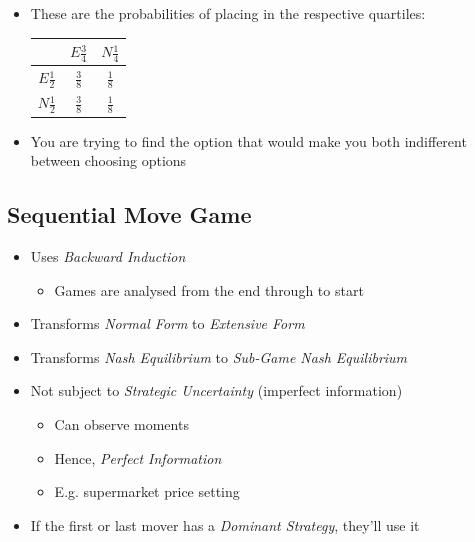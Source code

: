 \documentclass[11pt, english]{article}
\begin{document}
\begin{itemize}
\begin{itemize}
\begin{table}[h]
				\end{table}
			\item These are the probabilities of placing in the respective quartiles:
				\begin{table}[h]
					\scriptsize
                                        \renewcommand{\arraystretch}{1.25}
                                \begin{center}      
                                \begin{tabular}{|c|c|c|}
					\hline
					& $E\frac{3}{4}$ & $N\frac{1}{4}$\\
					\hline
					$E\frac{1}{2}$ & $\frac{3}{8}$ & $\frac{1}{8}$\\
					\hline
					$N\frac{1}{2}$ & $\frac{3}{8}$ & $\frac{1}{8}$\\
					\hline
				\end{tabular}
                                \end{center} 
                                \end{table}
			\item You are trying to find the option that would make you both indifferent between choosing options
		\end{itemize}
	\end{itemize}

	\newpage

	\subsection{Sequential Move Game}
	
	\begin{itemize}
	\setlength\itemsep{0cm}
		\item Uses \textit{Backward Induction}
		\begin{itemize}
			\item Games are analysed from the end through to start
		\end{itemize}
		\item Transforms \textit{Normal Form} to \textit{Extensive Form}
		\item Transforms \textit{Nash Equilibrium} to \textit{Sub-Game Nash Equilibrium}
		\item Not subject to \textit{Strategic Uncertainty} (imperfect information)
		\begin{itemize}
			\item Can observe moments
			\item Hence, \textit{Perfect Information}
			\item E.g. supermarket price setting
		\end{itemize}
		\item If the first or last mover has a \textit{Dominant Strategy}, they'll use it
	\end{itemize}
\end{document}
